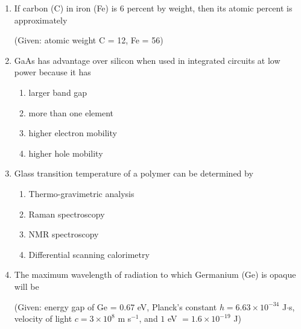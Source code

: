 \documentclass[journal]{IEEEtran}
\numberwithin{equation}{enumi}
\numberwithin{figure}{enumi}
\begin{document}
\begin{enumerate}
\item If carbon (C) in iron (Fe) is 6 percent by weight, then its atomic percent is approximately

(Given: atomic weight C = 12, Fe = 56)

\begin{enumerate}
\end{enumerate}
\bigskip

\item GaAs has advantage over silicon when used in integrated circuits at low power because it has

\begin{enumerate}
    \item larger band gap
    \item more than one element
    \item higher electron mobility
    \item higher hole mobility
\end{enumerate}
\bigskip

\item Glass transition temperature of a polymer can be determined by

\begin{enumerate}
    \item Thermo-gravimetric analysis
    \item Raman spectroscopy
    \item NMR spectroscopy
    \item Differential scanning calorimetry
\end{enumerate}
\bigskip

\item The maximum wavelength of radiation to which Germanium (Ge) is opaque will be

(Given: energy gap of Ge = 0.67 eV, Planck's constant $h = 6.63 \times 10^{-34}$ J$\cdot$s, velocity of light $c = 3 \times 10^8$ m s$^{-1}$, and $1$ eV $= 1.6 \times 10^{-19}$ J)

\begin{enumerate}
\end{enumerate}
\end{enumerate}
\end{document}
